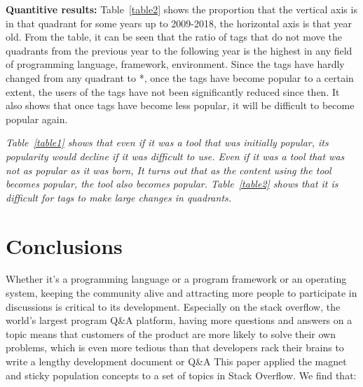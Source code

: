 \documentclass[english,preprint,JIP]{ipsj}
\begin{document}
\textbf{Quantitive results:}
Table~\ref{table2} shows the proportion that the vertical axis is in that quadrant for some years up to 2009-2018, the horizontal axis is that year old. From the table, it can be seen that the ratio of tags that do not move the quadrants from the previous year to the following year is the highest in any field of programming language, framework, environment. Since the tags have hardly changed from any quadrant to *, once the tags have become popular to a certain extent, the users of the tags have not been significantly reduced since then. It also shows that once tags have become less popular, it will be difficult to become popular again.
\smallskip

\emph{Table~\ref{table1} shows that even if it was a tool that was initially popular, its popularity would decline if it was difficult to use. Even if it was a tool that was not as popular as it was born, It turns out that as the content using the tool becomes popular, the tool also becomes popular. Table~\ref{table2} shows that it is difficult for tags to make large changes in quadrants.}



\section{Conclusions}

Whether it's a programming language or a program framework or an operating system, keeping the community alive and attracting more people to participate in discussions is critical to its development. Especially on the stack overflow, the world's largest program Q\&A platform, having more questions and answers on a topic means that customers of the product are more likely to solve their own problems, which is even more tedious than that developers rack their brains to write a lengthy development document or Q\&A This paper applied the magnet and sticky population concepts to a set of topics in Stack Overflow. We find that:
\end{document}
